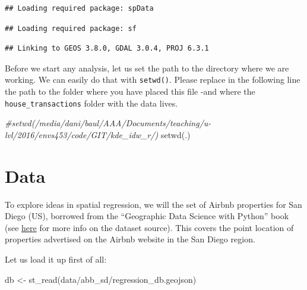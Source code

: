 \documentclass[
]{book}
\newenvironment{Shaded}{\begin{snugshade}}{\end{snugshade}}
\newcommand{\CommentTok}[1]{\textcolor[rgb]{0.56,0.35,0.01}{\textit{#1}}}
\newcommand{\FunctionTok}[1]{\textcolor[rgb]{0.00,0.00,0.00}{#1}}
\newcommand{\NormalTok}[1]{#1}
\newcommand{\OtherTok}[1]{\textcolor[rgb]{0.56,0.35,0.01}{#1}}
\newcommand{\StringTok}[1]{\textcolor[rgb]{0.31,0.60,0.02}{#1}}
\begin{document}
\begin{verbatim}
## Loading required package: spData
\end{verbatim}

\begin{verbatim}
## Loading required package: sf
\end{verbatim}

\begin{verbatim}
## Linking to GEOS 3.8.0, GDAL 3.0.4, PROJ 6.3.1
\end{verbatim}

Before we start any analysis, let us set the path to the directory where we are working. We can easily do that with \texttt{setwd()}. Please replace in the following line the path to the folder where you have placed this file -and where the \texttt{house\_transactions} folder with the data lives.

\begin{Shaded}
\begin{Highlighting}[]
\CommentTok{\#setwd(\textquotesingle{}/media/dani/baul/AAA/Documents/teaching/u{-}lvl/2016/envs453/code/GIT/kde\_idw\_r/\textquotesingle{})}
\FunctionTok{setwd}\NormalTok{(}\StringTok{\textquotesingle{}.\textquotesingle{}}\NormalTok{)}
\end{Highlighting}
\end{Shaded}

\hypertarget{data-2}{%
\section{Data}\label{data-2}}

To explore ideas in spatial regression, we will the set of Airbnb properties for San Diego (US), borrowed from the ``Geographic Data Science with Python'' book (see \href{https://geographicdata.science/book/data/airbnb/regression_cleaning.html}{here} for more info on the dataset source). This covers the point location of properties advertised on the Airbnb website in the San Diego region.

Let us load it up first of all:

\begin{Shaded}
\begin{Highlighting}[]
\NormalTok{db }\OtherTok{\textless{}{-}} \FunctionTok{st\_read}\NormalTok{(}\StringTok{\textquotesingle{}data/abb\_sd/regression\_db.geojson\textquotesingle{}}\NormalTok{)}
\end{Highlighting}
\end{Shaded}
\end{document}
